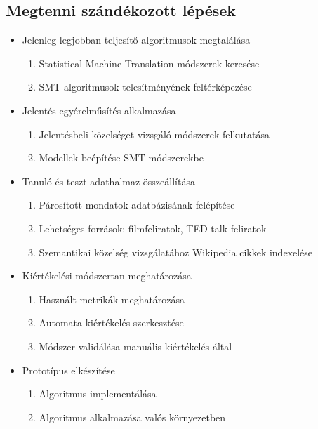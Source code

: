 \subsection{Megtenni szándékozott lépések}

\begin{frame}
	\begin{itemize}
		\item Jelenleg legjobban teljesítő algoritmusok megtalálása
		\begin{enumerate}
			\item Statistical Machine Translation módszerek keresése
			\item SMT algoritmusok telesítményének feltérképezése
		\end{enumerate}
		
		\item Jelentés egyérelműsítés alkalmazása
		\begin{enumerate}
			\item Jelentésbeli közelséget vizsgáló módszerek felkutatása
			\item Modellek beépítése SMT módszerekbe
		\end{enumerate}
		
		\item Tanuló és teszt adathalmaz összeállítása
		\begin{enumerate}
			\item Párosított mondatok adatbázisának felépítése
			\item Lehetséges források: filmfeliratok, TED talk feliratok
			\item Szemantikai közelség vizsgálatához Wikipedia cikkek indexelése
		\end{enumerate}
		
	\end{itemize}
\end{frame}

\begin{frame}
	\begin{itemize}
	\item Kiértékelési módszertan meghatározása
		\begin{enumerate}
			\item Használt metrikák meghatározása
			\item Automata kiértékelés szerkesztése
			\item Módszer validálása manuális kiértékelés által
		\end{enumerate}
		
		\item Prototípus elkészítése
		\begin{enumerate}
			\item Algoritmus implementálása
			\item Algoritmus alkalmazása valós környezetben
		\end{enumerate}
	\end{itemize}
\end{frame}
